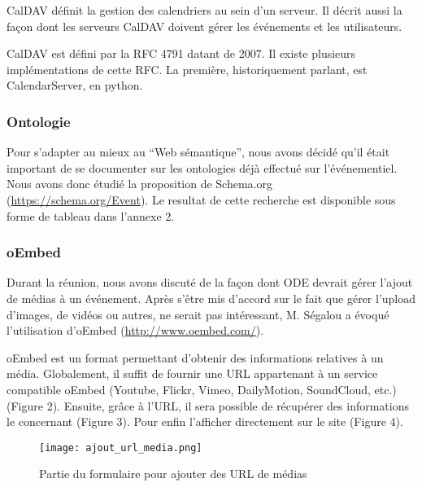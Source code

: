 CalDAV définit la gestion des calendriers au sein d'un serveur. Il décrit aussi la façon dont les serveurs CalDAV doivent gérer les événements et les utilisateurs.

CalDAV est défini par la RFC 4791 datant de 2007. Il existe plusieurs implémentations de cette RFC. La première, historiquement parlant, est CalendarServer, en python.

\subsubsection*{Ontologie}

Pour s'adapter au mieux au ``Web sémantique'', nous avons décidé qu'il était important de se documenter sur les ontologies déjà effectué sur l'événementiel. Nous avons donc étudié la proposition de Schema.org (\url{https://schema.org/Event}). Le resultat de cette recherche est disponible sous forme de tableau dans l'annexe 2.

\subsubsection*{oEmbed}

Durant la réunion, nous avons discuté de la façon dont ODE devrait gérer l'ajout de médias à un événement. Après s'être mis d'accord sur le fait que gérer l'upload d'images, de vidéos ou autres, ne serait pas intéressant, M. Ségalou a évoqué l'utilisation d'oEmbed (\url{http://www.oembed.com/}).

oEmbed est un format permettant d'obtenir des informations relatives à un média. Globalement, il suffit de fournir une URL appartenant à un service compatible oEmbed (Youtube, Flickr, Vimeo, DailyMotion, SoundCloud, etc.) (Figure 2). Ensuite, grâce à l'URL, il sera possible de récupérer des informations le concernant (Figure 3). Pour enfin l'afficher directement sur le site (Figure 4).

\newpage

\begin{figure}[H]
\begin{center}
\texttt{[image: ajout\_url\_media.png]}
\end{center}
\caption{Partie du formulaire pour ajouter des URL de médias}
\end{figure}


